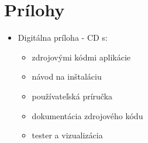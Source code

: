 \documentclass[12pt,a4paper]{report}
\theoremstyle{definition}
\theoremstyle{remark}
\begin{document}
\chapter*{Prílohy}

\begin{itemize}
\item Digitálna príloha - CD s:
	\begin{itemize}
	\item zdrojovými kódmi aplikácie
	\item návod na inštaláciu
	\item používateľská príručka
	\item dokumentácia zdrojového kódu
	\item tester a vizualizácia
	\end{itemize}
\end{itemize}
\end{document}
